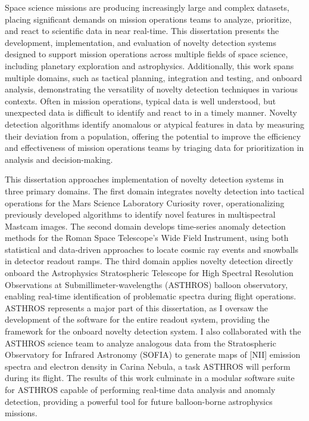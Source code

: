 Space science missions are producing increasingly large and complex datasets, placing significant demands on mission operations teams to analyze, prioritize, and react to scientific data in near real-time.
This dissertation presents the development, implementation, and evaluation of novelty detection systems designed to support mission operations across multiple fields of space science, including planetary exploration and astrophysics.
Additionally, this work spans multiple domains, such as tactical planning, integration and testing, and onboard analysis, demonstrating the versatility of novelty detection techniques in various contexts.
Often in mission operations, typical data is well understood, but unexpected data is difficult to identify and react to in a timely manner.
Novelty detection algorithms identify anomalous or atypical features in data by measuring their deviation from a population, offering the potential to improve the efficiency and effectiveness of mission operations teams by triaging data for prioritization in analysis and decision-making.

This dissertation approaches implementation of novelty detection systems in three primary domains.
The first domain integrates novelty detection into tactical operations for the Mars Science Laboratory Curiosity rover, operationalizing previously developed algorithms to identify novel features in multispectral Mastcam images.
The second domain develops time-series anomaly detection methods for the Roman Space Telescope's Wide Field Instrument, using both statistical and data-driven approaches to locate cosmic ray events and snowballs in detector readout ramps.
The third domain applies novelty detection directly onboard the Astrophysics Stratospheric Telescope for High Spectral Resolution Observations at Submillimeter-wavelengths (ASTHROS) balloon observatory, enabling real-time identification of problematic spectra during flight operations.
ASTHROS represents a major part of this dissertation, as I oversaw the development of the software for the entire readout system, providing the framework for the onboard novelty detection system.
I also collaborated with the ASTHROS science team to analyze analogous data from the Stratospheric Observatory for Infrared Astronomy (SOFIA) to generate maps of [NII] emission spectra and electron density in Carina Nebula, a task ASTHROS will perform during its flight.
The results of this work culminate in a modular software suite for ASTHROS capable of performing real-time data analysis and anomaly detection, providing a powerful tool for future balloon-borne astrophysics missions.
